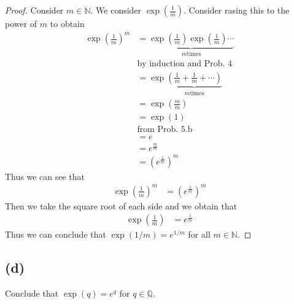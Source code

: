 \documentclass[12pt]{amsart}
\newcommand{\prob}[1]{Prob. #1}
\newcommand{\N}{\mathbb{N}}
\newcommand{\Q}{\mathbb{Q}}
\begin{document}
\begin{proof}
  Consider $m\in\N$. We consider $\exp\left(\frac{1}{m}\right)$. Consider
  rasing this to the power of $m$ to obtain
  \begin{align*}
    \exp\left(\frac{1}{m}\right)^m&=\underbrace{\exp\left(\frac{1}{m}\right)\exp\left(\frac{1}{m}\right)\cdots}_\text{$m$
    times}\\
                                  &\text{by induction and \prob{4}}\\
                                  &=\exp\underbrace{\left(\frac{1}{m}+\frac{1}{m}+\cdots\right)}_\text{$m$
                                  times}\\
                                  &=\exp\left(\frac{m}{m}\right)\\
                                  &=\exp(1)\\
                                  &\text{from \prob{5.b}}\\
                                  &=e\\
                                  &=e^\frac{m}{m}\\
                                  &=\left(e^\frac{1}{m}\right)^m
    \end{align*}
    Thus we can see that
    \begin{align*}
      \exp\left(\frac{1}{m}\right)^m&=\left(e^\frac{1}{m}\right)^m
    \end{align*}
    Then we take the square root of each side and we obtain that
    \begin{align*}
      \exp\left(\frac{1}{m}\right)&=e^\frac{1}{m}
    \end{align*}
    Thus we can conclude that $\exp(1/m)=e^{1/m}$ for all $m\in\N$.
  \end{proof}

  \subsection*{(d)}%
  \label{sub:_d_}

  Conclude that $\exp(q)=e^q$ for $q\in\Q$.
\end{document}
